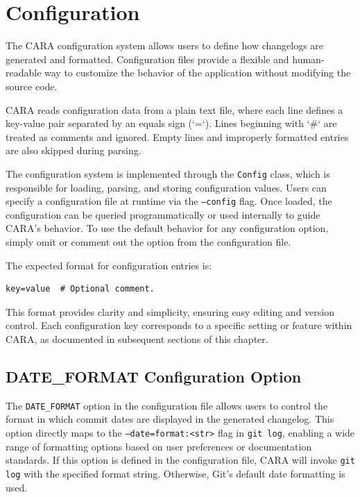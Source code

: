 \chapter{Configuration}
\label{ch:configuration}
\pagestyle{fancy}

The CARA configuration system allows users to define how changelogs are generated and formatted. Configuration files provide a flexible and human-readable way to customize the behavior of the application without modifying the source code.

CARA reads configuration data from a plain text file, where each line defines a key-value pair separated by an equals sign (`=`). Lines beginning with `\#` are treated as comments and ignored. Empty lines and improperly formatted entries are also skipped during parsing.

The configuration system is implemented through the \texttt{Config} class, which is responsible for loading, parsing, and storing configuration values. Users can specify a configuration file at runtime via the \texttt{--config} flag. Once loaded, the configuration can be queried programmatically or used internally to guide CARA’s behavior. To use the default behavior for any configuration option, simply omit or comment out the option from the configuration file.

The expected format for configuration entries is:

\begin{lstlisting}[style=cppstyle]
key=value  # Optional comment.
\end{lstlisting}

This format provides clarity and simplicity, ensuring easy editing and version control. Each configuration key corresponds to a specific setting or feature within CARA, as documented in subsequent sections of this chapter.















\section{DATE\_FORMAT Configuration Option}
\label{section:date_format}

The \texttt{DATE\_FORMAT} option in the configuration file allows users to control the format in which commit dates are displayed in the generated changelog. This option directly maps to the \texttt{--date=format:<str>} flag in \texttt{git log}, enabling a wide range of formatting options based on user preferences or documentation standards. If this option is defined in the configuration file, CARA will invoke \texttt{git log} with the specified format string. Otherwise, Git's default date formatting is used. 

